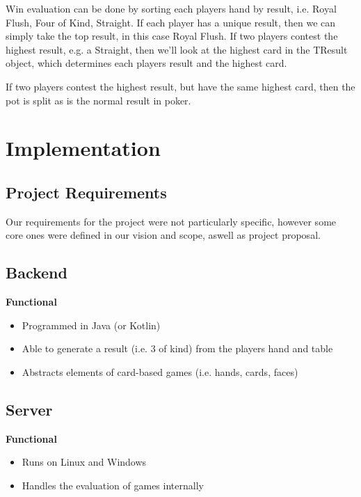 \documentclass[11pt]{article}
\begin{document}
Win evaluation can be done by sorting each players hand by result, i.e. Royal Flush, Four of Kind, Straight. If each player has a unique result, then we can simply take the top result, in this case Royal Flush. If two players contest the highest result, e.g. a Straight, then we'll look at the highest card in the TResult object, which determines each players result and the highest card. 

If two players contest the highest result, but have the same highest card, then the pot is split as is the normal result in poker. 


\section{Implementation}

\subsection{Project Requirements}
Our requirements for the project were not particularly specific, however some core ones were defined in our vision and scope, aswell as project proposal. 

\subsection{Backend}
\textbf{Functional}
\begin{itemize}
	\item Programmed in Java (or Kotlin)
	\item Able to generate a result (i.e. 3 of kind) from the players hand and table
	\item Abstracts elements of card-based games (i.e. hands, cards, faces)
\end{itemize}
%	

\subsection{Server}
\textbf{Functional}
\begin{itemize}
	\item Runs on Linux and Windows
	\item Handles the evaluation of games internally
\end{itemize}

%
\end{document}
